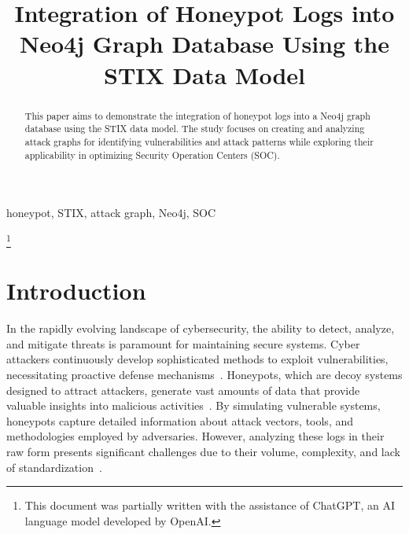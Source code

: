 \documentclass[conference]{IEEEtran}
\begin{document}
\title{Integration of Honeypot Logs into Neo4j Graph Database Using the STIX Data Model}

\author{
\and
{}
}

\maketitle

\begin{abstract}
This paper aims to demonstrate the integration of honeypot logs into a Neo4j graph database using the STIX data model. The study focuses on creating and analyzing attack graphs for identifying vulnerabilities and attack patterns while exploring their applicability in optimizing Security Operation Centers (SOC).
\end{abstract}

\begin{IEEEkeywords}
honeypot, STIX, attack graph, Neo4j, SOC
\end{IEEEkeywords}

\thanks{This document was partially written with the assistance of ChatGPT, an AI language model developed by OpenAI.\cite{openai2024chatgpt}}

\section{Introduction}

In the rapidly evolving landscape of cybersecurity, the ability to detect, analyze, and mitigate threats is paramount for maintaining secure systems. Cyber attackers continuously develop sophisticated methods to exploit vulnerabilities, necessitating proactive defense mechanisms~\cite{mirkovic2004taxonomy}. Honeypots, which are decoy systems designed to attract attackers, generate vast amounts of data that provide valuable insights into malicious activities~\cite{spitzner2003honeypots, provos2007virtual}. By simulating vulnerable systems, honeypots capture detailed information about attack vectors, tools, and methodologies employed by adversaries. However, analyzing these logs in their raw form presents significant challenges due to their volume, complexity, and lack of standardization~\cite{katti2018honeypot}.
\end{document}
